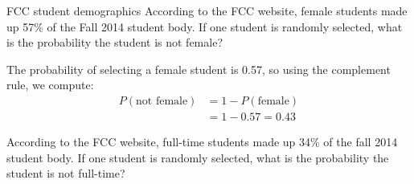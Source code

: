 \begin{example}[https://www.youtube.com/watch?v=ICbVL7wFRYU&list=PLfmpjsIzhzts14-9s5QixRje97EI2oeMF&index=18]{FCC student demographics}
According to the FCC website, female students made up 57\% of the Fall 2014 student body. If one student is randomly selected, what is the probability the student is not female? 

\sol
The probability of selecting a female student is 0.57, so using the complement rule, we compute:
\begin{align*}
P(\mbox{not female}) &= 1 - P(\mbox{female})\\
&= 1 - 0.57 = \boxed{0.43}
\end{align*}
\end{example}

\begin{try}
According to the FCC website, full-time students made up 34\% of the fall 2014 student body. If one student is randomly selected, what is the probability the student is not full-time?
\end{try}